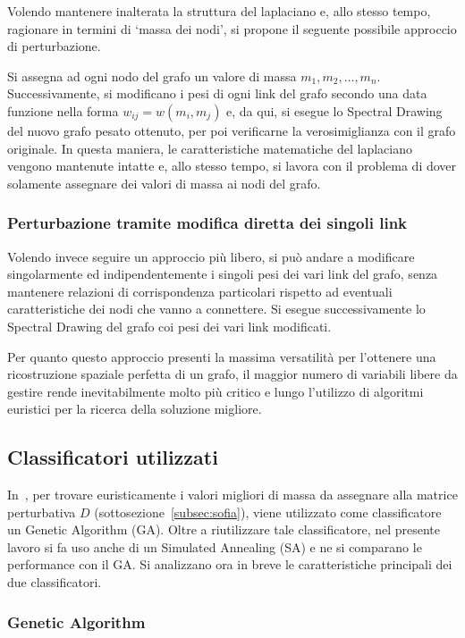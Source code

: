 \documentclass[10pt,a4paper]{article}
\begin{document}
Volendo mantenere inalterata la struttura del laplaciano e, allo stesso tempo, ragionare in termini di `massa dei nodi', si propone il seguente possibile approccio di perturbazione.

Si assegna ad ogni nodo del grafo un valore di massa \(m_1, m_2, \dots, m_n\).
Successivamente, si modificano i pesi di ogni link del grafo secondo una data funzione nella forma \(w_{ij} = w(m_i, m_j)\) e, da qui, si esegue lo Spectral Drawing del nuovo grafo pesato ottenuto, per poi verificarne la verosimiglianza con il grafo originale.
In questa maniera, le caratteristiche matematiche del laplaciano vengono mantenute intatte e, allo stesso tempo, si lavora con il problema di dover solamente assegnare dei valori di massa ai nodi del grafo.

\subsubsection{Perturbazione tramite modifica diretta dei singoli link}

Volendo invece seguire un approccio più libero, si può andare a modificare singolarmente ed indipendentemente i singoli pesi dei vari link del grafo, senza mantenere relazioni di corrispondenza particolari rispetto ad eventuali caratteristiche dei nodi che vanno a connettere.
Si esegue successivamente lo Spectral Drawing del grafo coi pesi dei vari link modificati.

Per quanto questo approccio presenti la massima versatilità per l'ottenere una ricostruzione spaziale perfetta di un grafo, il maggior numero di variabili libere da gestire rende inevitabilmente molto più critico e lungo l'utilizzo di algoritmi euristici per la ricerca della soluzione migliore.

\subsection{Classificatori utilizzati}

In~\cite{tesi_sofia_farina}, per trovare euristicamente i valori migliori di massa da assegnare alla matrice perturbativa \(D\) (sottosezione~\ref{subsec:sofia}), viene utilizzato come classificatore un Genetic Algorithm (GA).
Oltre a riutilizzare tale classificatore, nel presente lavoro si fa uso anche di un Simulated Annealing (SA) e ne si comparano le performance con il GA.
Si analizzano ora in breve le caratteristiche principali dei due classificatori.

\subsubsection{Genetic Algorithm}
\end{document}
